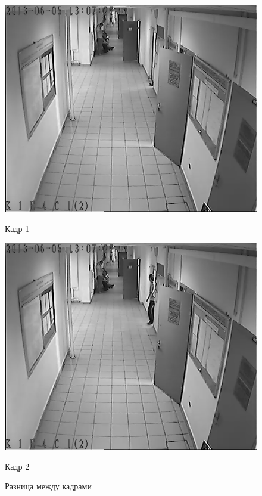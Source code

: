 \begin{figure}[!htb]
	\includegraphics[width=\linewidth]{img/frame_1.png}
	\caption{Кадр 1}
	\label{motion_detection_1}
\endminipage\hfill
{}
	\includegraphics[width=\linewidth]{img/frame_2.png}
	\caption{Кадр 2}
	\label{motion_detection_2}
\endminipage

\def\svgwidth{\columnwidth}
\caption{Разница между кадрами}
\label{motion_detection_3}
\end{figure}


